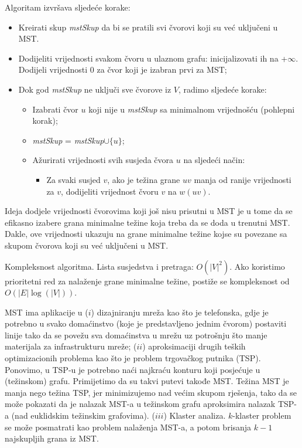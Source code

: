 \documentclass[a4paper, utf8, 11pt, colorlinks]{book}
\begin{document}
Algoritam izvršava sljedeće korake:

\begin{itemize}
	\item Kreirati skup \emph{mstSkup} da bi se pratili svi čvorovi koji su već uključeni u MST.
	\item Dodijeliti vrijednosti svakom čvoru u ulaznom grafu: inicijalizovati ih na +$\infty$. 
	      Dodijeli vrijednosti 0 za čvor koji je izabran prvi za MST;
	\item Dok god \emph{mstSkup} ne uključi sve čvorove iz $V$, radimo sljedeće korake:
	\begin{itemize}
		\item Izabrati čvor $u$ koji nije u \emph{mstSkup} sa minimalnom vrijednošću (pohlepni korak);
		\item \emph{mstSkup} = \emph{mstSkup}$\cup \{u\}$;
		\item Ažurirati vrijednosti svih susjeda čvora $u$ na sljedeći način:
		     \begin{itemize}
		     	\item Za svaki susjed $v$, ako je težina grane $uv$ manja od
		             ranije vrijednosti za $v$, dodijeliti vrijednost čvoru $v$ na $w(uv)$. 		    
	         \end{itemize}
	\end{itemize}
\end{itemize}

Ideja dodjele vrijednosti čvorovima koji još nisu prisutni u MST je u tome da se efikasno izabere grana minimalne težine koja treba da se doda u trenutni MST. Dakle, ove vrijednosti ukazuju na grane minimalne težine kojse su povezane sa skupom čvorova koji su već uključeni u MST.

Kompleksnost algoritma. Lista susjedstva i pretraga: $O(|V|^2)$. Ako  koristimo prioritetni red za nalaženje grane minimalne težine, postiže se kompleksnost od $O( |E| \log(|V|))$. 

MST ima aplikacije u ($i$) dizajniranju mreža kao što je telefonska, gdje je potrebno u svako domaćinstvo (koje je predstavljeno jednim čvorom) postaviti linije tako da se povežu sva domaćinstva u mrežu uz potrošnju što manje materijala za infrastrukturu mreže; ($ii$) aproksimaciji drugih teških optimizacionih problema kao što je problem trgovačkog putnika (TSP). Ponovimo, u TSP-u je potrebno naći najkraću konturu koji posjećuje u (težinskom) grafu. Primijetimo da su takvi putevi takođe MST. Težina MST je manja nego težina TSP, jer minimizujemo nad većim skupom rješenja, tako da se može pokazati da je nalazak MST-a u težinskom grafu aproksimira nalazak TSP-a (nad euklidskim težinskim grafovima).  
($iii$) Klaster analiza. $k$-klaster problem  se može posmatrati kao problem nalaženja MST-a, a potom brisanja $k-1$ najskupljih grana iz MST. 
\end{document}
